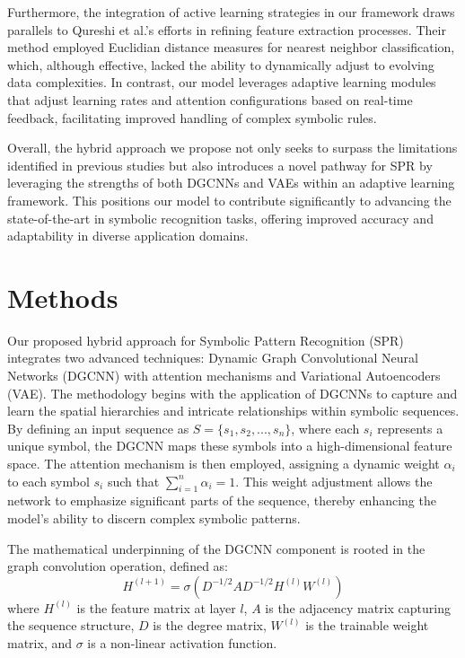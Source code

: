 \documentclass{article}
\begin{document}
Furthermore, the integration of active learning strategies in our framework draws parallels to Qureshi et al.’s efforts in refining feature extraction processes. Their method employed Euclidian distance measures for nearest neighbor classification, which, although effective, lacked the ability to dynamically adjust to evolving data complexities. In contrast, our model leverages adaptive learning modules that adjust learning rates and attention configurations based on real-time feedback, facilitating improved handling of complex symbolic rules.

Overall, the hybrid approach we propose not only seeks to surpass the limitations identified in previous studies but also introduces a novel pathway for SPR by leveraging the strengths of both DGCNNs and VAEs within an adaptive learning framework. This positions our model to contribute significantly to advancing the state-of-the-art in symbolic recognition tasks, offering improved accuracy and adaptability in diverse application domains.

\section{Methods}
Our proposed hybrid approach for Symbolic Pattern Recognition (SPR) integrates two advanced techniques: Dynamic Graph Convolutional Neural Networks (DGCNN) with attention mechanisms and Variational Autoencoders (VAE). The methodology begins with the application of DGCNNs to capture and learn the spatial hierarchies and intricate relationships within symbolic sequences. By defining an input sequence as \( S = \{s_1, s_2, ..., s_n\} \), where each \( s_i \) represents a unique symbol, the DGCNN maps these symbols into a high-dimensional feature space. The attention mechanism is then employed, assigning a dynamic weight \( \alpha_i \) to each symbol \( s_i \) such that \(\sum_{i=1}^{n} \alpha_i = 1\). This weight adjustment allows the network to emphasize significant parts of the sequence, thereby enhancing the model's ability to discern complex symbolic patterns.

The mathematical underpinning of the DGCNN component is rooted in the graph convolution operation, defined as:
\[
H^{(l+1)} = \sigma(D^{-1/2}AD^{-1/2}H^{(l)}W^{(l)})
\]
where \( H^{(l)} \) is the feature matrix at layer \( l \), \( A \) is the adjacency matrix capturing the sequence structure, \( D \) is the degree matrix, \( W^{(l)} \) is the trainable weight matrix, and \( \sigma \) is a non-linear activation function.
\end{document}
